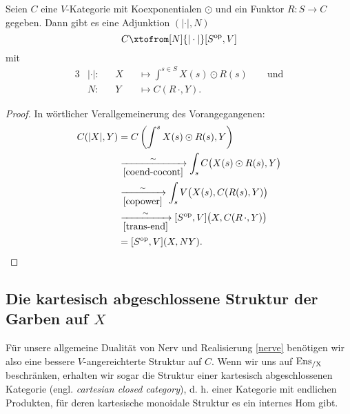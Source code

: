 \begin{theorem} 
  \label{nerve}
  Seien $C$ eine $V$-Kategorie mit Koexponentialen $\odot$ und ein
  Funktor $R: S \to C$ gegeben. Dann gibt es eine Adjunktion
  $(|\cdot|, N)$
  \[ C \xtofrom[N]{|\cdot|} [S\op, V] \]
  mit
  \begin{alignat*}{3}
    &|\cdot|: && X &&\mapsto \int^{s \in S} X(s) \odot R(s) \qquad \text{und} \\
    &N: && Y &&\mapsto C(R \, \cdot, Y).
  \end{alignat*}
\end{theorem}
\begin{proof}
  In wörtlicher Verallgemeinerung des Vorangegangenen:
  \begin{align*}
     C(|X|, Y)
     &= C \left( \int^s X(s) \odot R(s), Y \right) \\
     & \xrightarrow[\ref{coend-cocont}]{\sim}
       \int_s C \big( X(s) \odot R(s), Y \big) \\
     & \xrightarrow[\ref{copower}]{\sim}
       \int_s V \big( X(s), C(R(s), Y) \big) \\
     & \xrightarrow[\ref{trans-end}]{\sim}
       [S^\mathrm{op}, V] \big( X, C(R \, \cdot, Y) \big) \\
     &= [S^\mathrm{op}, V] (X, NY).
  \end{align*}
\end{proof}

\subsection{Die kartesisch abgeschlossene Struktur der Garben auf $X$}

Für unsere allgemeine Dualität von Nerv und Realisierung \ref{nerve}
benötigen wir also eine bessere $V$-angereichterte Struktur auf
$C$. Wenn wir uns auf $\operatorname{Ens_{/X}}$ beschränken, erhalten wir sogar die
Struktur einer kartesisch abgeschlossenen Kategorie
(engl. \emph{cartesian closed category}), d. h. einer Kategorie mit
endlichen Produkten, für deren kartesische monoidale Struktur es ein
internes Hom gibt.


